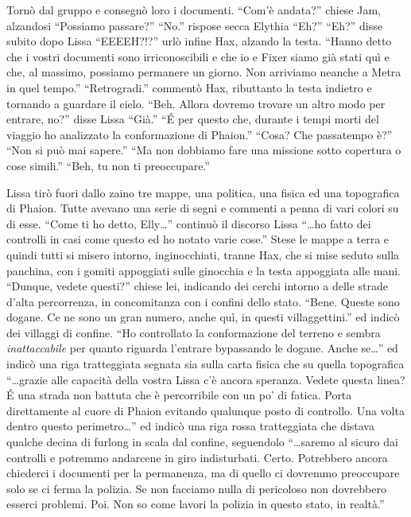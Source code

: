     Tornò dal gruppo e consegnò loro i documenti. ``Com'è andata?'' chiese Jam,
    alzandosi ``Possiamo passare?'' ``No.'' rispose secca Elythia ``Eh?''
    ``Eh?'' disse subito dopo Lissa ``EEEEH?!?'' urlò infine Hax, alzando
    la testa. ``Hanno detto che i vostri documenti sono irriconoscibili e
    che io e Fixer siamo già stati quì e che, al massimo, possiamo
    permanere un giorno. Non arriviamo neanche a Metra in quel tempo.''
    ``Retrogradi.'' commentò Hax, ributtanto la testa indietro e tornando a
    guardare il cielo. ``Beh. Allora dovremo trovare un altro modo per
    entrare, no?'' disse Lissa ``Già.'' ``\'E per questo che, durante i
    tempi morti del viaggio ho analizzato la conformazione di Phaion.''
    ``Cosa? Che passatempo è?'' ``Non si può mai sapere.'' ``Ma non
    dobbiamo fare una missione sotto copertura o cose simili.'' ``Beh, tu
    non ti preoccupare.''

    Lissa tirò fuori dallo zaino tre mappe, una politica, una fisica ed una
    topografica di Phaion. Tutte avevano una serie di segni e commenti a penna di vari
    colori su di esse. ``Come ti ho detto, Elly\dots{}'' continuò il
    discorso Lissa ``\dots{}ho fatto dei controlli in casi come questo ed
    ho notato varie cose.'' Stese le mappe a terra e quindi tutti si misero
    intorno, inginocchiati, tranne Hax, che si mise seduto sulla panchina,
    con i gomiti appoggiati sulle ginocchia e la testa appoggiata alle
    mani. ``Dunque, vedete questi?'' chiese lei, indicando dei cerchi
    intorno a delle strade d'alta percorrenza, in concomitanza con i
    confini dello stato. ``Bene. Queste sono dogane. Ce ne sono un gran
    numero, anche quì, in questi villaggettini.'' ed indicò dei villaggi di
    confine. ``Ho controllato la conformazione del terreno e sembra
    \emph{inattaccabile} per quanto riguarda l'entrare bypassando le
    dogane. Anche se\dots{}'' ed indicò una riga tratteggiata segnata sia
    sulla carta fisica che su quella topografica ``\dots{}grazie alle
    capacità della vostra Lissa c'è ancora speranza. Vedete questa linea?
    \'E una strada non battuta che è percorribile con un po' di fatica.
    Porta direttamente al cuore di Phaion evitando qualunque posto di
    controllo. Una volta dentro questo perimetro\dots{}'' ed indicò una
    riga rossa tratteggiata che distava qualche decina di furlong in scala
    dal confine, seguendolo ``\dots{}saremo al sicuro dai controlli e
    potremmo andarcene in giro indisturbati. Certo. Potrebbero ancora
    chiederci i documenti per la permanenza, ma di quello ci dovremmo
    preoccupare solo se ci ferma la polizia. Se non facciamo nulla di
    pericoloso non dovrebbero esserci problemi. Poi. Non so come lavori la
    polizia in questo stato, in realtà.''

